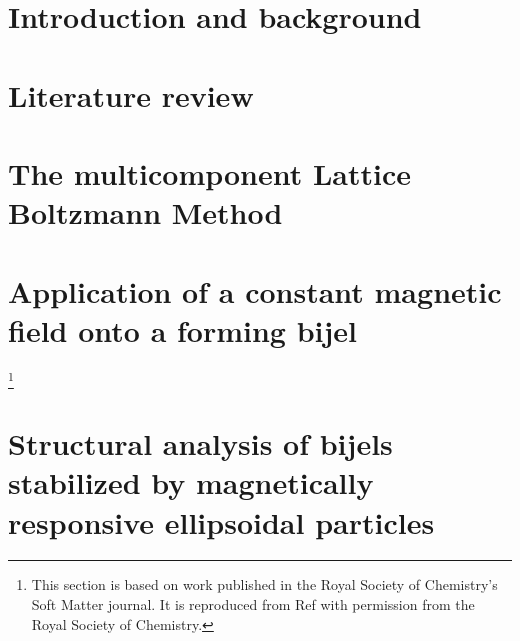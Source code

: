 \documentclass{udthesis}
\begin{document}


% 

% 

\chapter{Introduction and background}
\label{chapter:introduction}


\chapter{Literature review}
\label{chapter:lit_review}


\chapter{The multicomponent Lattice Boltzmann Method}
\label{chapter:methods_chapter}


% 

\chapter{Application of a constant magnetic field onto a forming bijel}
\footnote{This section is based on work published in the Royal Society of Chemistry's Soft Matter journal. \cite{karthikeyan_formation_2024} 
It is reproduced from Ref \cite{karthikeyan_formation_2024} with permission from the Royal Society of Chemistry.}
\label{chapter:aim1}


\chapter{Structural analysis of bijels stabilized by magnetically responsive ellipsoidal particles}
\label{chapter:aim1_5}

\end{document}
